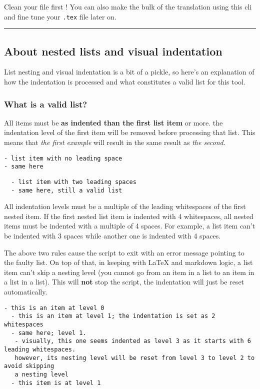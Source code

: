 \documentclass[a4paper, 12pt, twoside]{article}
\begin{document}
Clean your file first ! You can also make the bulk of the translation using this cli and fine tune your \texttt{.tex} 
file later on.

\par\noindent\rule{\linewidth}{0.4pt}
\subsection{About nested lists and visual indentation}

List nesting and visual indentation is a bit of a pickle, so here's an explanation of how
the indentation is processed and what constitutes a valid list for this tool.
\subsubsection{What is a valid list?}

All items must be \textbf{as indented than the first list item} or more. the indentation level of the first item
will be removed before processing that list. This means that \textit{the first example} will result in the same
result as \textit{the second}.

\begin{lstlisting}
- list item with no leading space
- same here
\end{lstlisting}

\begin{lstlisting}
  - list item with two leading spaces
  - same here, still a valid list
\end{lstlisting}

All indentation levels must be a multiple of the leading whitespaces of the first nested item. If the first nested 
list item is indented with 4 whitespaces, all nested items must be indented with a multiple of 4 spaces. For example,
a list item can't be indented with 3 spaces while another one is indented with 4 spaces.

The above two rules cause the script to exit with an error message pointing to the faulty list. On top of that,
in keeping with LaTeX and markdown logic, a list item can't skip a nesting level (you cannot go from an item in a list
to an item in a list in a list). This will \textbf{not} stop the script, the indentation will just be reset automatically.

\begin{lstlisting}
- this is an item at level 0
  - this is an item at level 1; the indentation is set as 2 whitespaces
  - same here; level 1.
   - visually, this one seems indented as level 3 as it starts with 6 leading whitespaces.
   however, its nesting level will be reset from level 3 to level 2 to avoid skipping
   a nesting level
  - this item is at level 1
\end{lstlisting}
\end{document}
